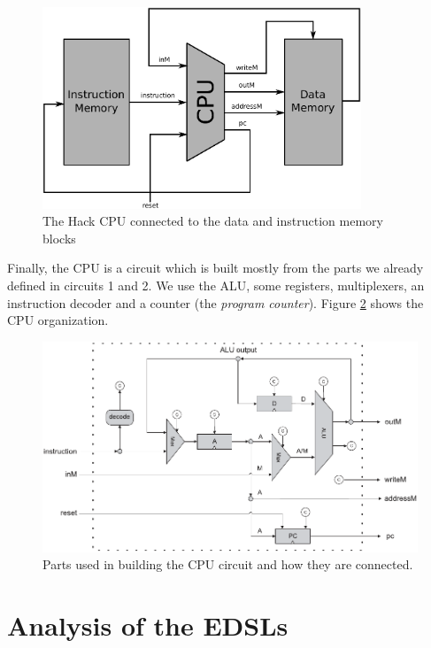 \documentclass[a4paper]{article}
\begin{document}
            \begin{figure}[h!]
                \centerline{\includegraphics[width=0.85\textwidth]{imgs/cpu-memory.pdf}}
                \caption{The Hack CPU connected to the data and instruction memory blocks
                    \label{fig:cpu-memory}}
            \end{figure}

            Finally, the CPU is a circuit which is built mostly from the parts we already defined in
            circuits 1 and 2. We use the ALU, some registers, multiplexers, an instruction decoder
            and a counter (the \emph{program counter}). Figure \ref{fig:cpu-parts} shows the CPU
            organization.

            \begin{figure}[h!]
                \centerline{\includegraphics[width=1.0\textwidth]{imgs/cpu-parts.pdf}}
                \caption{Parts used in building the CPU circuit and how they are connected.
                    \label{fig:cpu-parts}}
            \end{figure}

    \section{Analysis of the EDSLs}
    \label{sec:edsls}
\end{document}
